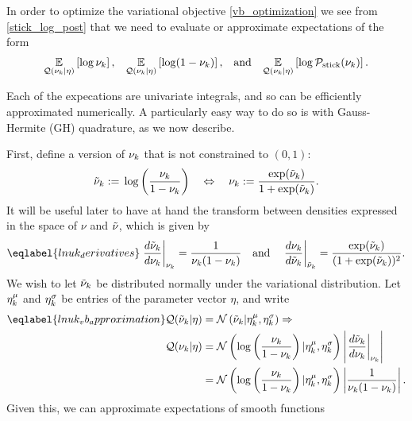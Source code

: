 In order to optimize the variational objective \eqref{vb_optimization} we see
from \eqref{stick_log_post} that we need to evaluate or approximate expectations
of the form
%
\begin{align*}
%
\expect{\q(\nuk \vert \eta)}{\log \nuk}
\textrm{,}\quad
\expect{\q(\nuk \vert \eta)}{\log (1 - \nuk)}
\textrm{,}\quad\textrm{and}\quad
\expect{\q(\nuk \vert \eta)}{\log \pstick(\nuk)}.
%
\end{align*}

Each of the expecations are univariate integrals, and so can be efficiently
approximated numerically.  A particularly easy way to do so is with
Gauss-Hermite (GH) quadrature, as we now describe.

First, define a version of $\nu_{k}$ that is not constrained to $(0,1)$:
%
\begin{align*}
%
\lnu_\k :={} \log \left( \frac{\nuk}{1 - \nuk} \right)
\quad\Leftrightarrow\quad
\nuk :={} \frac{\exp(\lnuk)}{1 + \exp(\lnuk)}.
%
\end{align*}
%
It will be useful later to have at hand the transform between densities
expressed in the space of $\nu$ and $\tilde{\nu}$, which is given by
%
\begin{align}\eqlabel{lnuk_derivatives}
%
\fracat{d \lnu_\k}{ d\nuk}{\nuk} ={}
    \frac{1}{\nuk (1 - \nuk)} \mathand
%
\fracat{d \nuk}{ d\lnuk}{\lnuk} ={}
    \frac{\exp(\lnuk)}{(1 + \exp(\lnuk))^2}.
%
\end{align}
%
We wish to let $\tilde{\nu}_k$ be distributed normally under the variational
distribution.  Let $\eta^{\mu}_k$ and $\eta^{\sigma}_k$ be entries of the parameter
vector $\eta$, and write
%
\begin{align}\eqlabel{lnuk_vb_approximation}
%
\q(\lnu_\k \vert \eta) ={}& \normdist{\lnu_\k \vert \lnumean_\k, \lnusd_\k}
\Rightarrow \\
\q(\nuk \vert \eta) ={}&
    \normdist{\log \left( \frac{\nuk}{1 - \nuk} \right)
        \vert \lnumean_\k, \lnusd_\k}
    \left|\fracat{d \lnu_\k}{ d\nuk}{\nuk}\right|
\nonumber\\={}&
\normdist{\log \left( \frac{\nuk}{1 - \nuk} \right)
        \vert \lnumean_\k, \lnusd_\k}
    \left|\frac{1}{\nuk (1 - \nuk)}\right|.
\nonumber
%
\end{align}
%
Given this, we can approximate expectations of smooth functions
